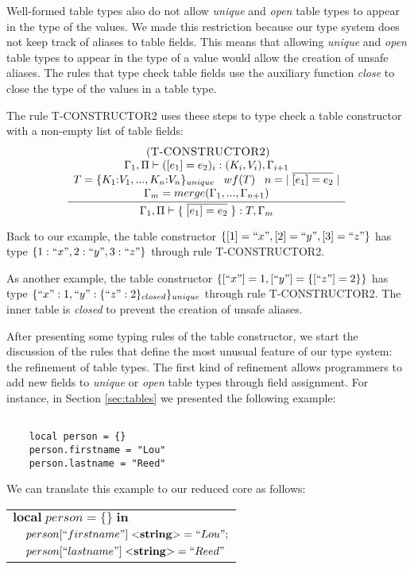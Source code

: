 Well-formed table types also do not allow \emph{unique} and
\emph{open} table types to appear in the type of the values.
We made this restriction because our type system does not keep
track of aliases to table fields.
This means that allowing \emph{unique} and \emph{open} table
types to appear in the type of a value would allow the
creation of unsafe aliases.
The rules that type check table fields use the auxiliary function
\emph{close} to close the type of the values in a table type.

The rule \textsc{T-CONSTRUCTOR2} uses these steps to type check a
table constructor with a non-empty list of table fields:
\[
\begin{array}{c}
\; (\textsc{T-CONSTRUCTOR2})\\
\dfrac{\begin{array}{c}
       \Gamma_{1}, \Pi \vdash ([e_{1}] = e_{2})_{i}:(K_{i},V_{i}), \Gamma_{i+1} \\
       T = \{K_{1}{:}V_{1}, ..., K_{n}{:}V_{n}\}_{unique} \;\;\;
       wf(T) \;\;\;
       n = |\;\overline{[e_{1}] = e_{2}}\;| \\
       \Gamma_{m} = merge(\Gamma_{1}, ..., \Gamma_{n+1}) 
       \end{array}}
      {\Gamma_{1}, \Pi \vdash \{\;\overline{[e_{1}] = e_{2}}\;\}:T, \Gamma_{m}}
\end{array}
\]

Back to our example, the table constructor
$\{ [1] = ``x", [2] = ``y", [3] = ``z" \}$ has type
$\{1:``x", 2:``y", 3:``z"\}$ through rule \textsc{T-CONSTRUCTOR2}.

As another example, the table constructor $\{[``x"] = 1, [``y"] = \{[``z"] = 2\}\}$
has type $\{``x":1, ``y":\{``z":2\}_{closed}\}_{unique}$ through rule
\textsc{T-CONSTRUCTOR2}.
The inner table is \emph{closed} to prevent the creation of unsafe aliases.

After presenting some typing rules of the table constructor,
we start the discussion of the rules that define the most
unusual feature of our type system: the refinement of table types.
The first kind of refinement allows programmers to add new
fields to \emph{unique} or \emph{open} table types through
field assignment.
For instance, in Section \ref{sec:tables} we presented the
following example:
\begin{verbatim}

    local person = {}
    person.firstname = "Lou"
    person.lastname = "Reed"
\end{verbatim}

We can translate this example to our reduced core as follows:
\begin{center}
\begin{tabular}{ll}
\multicolumn{2}{l}{$\mathbf{local} \; person = \{\} \; \mathbf{in}$}\\
& \multicolumn{1}{l}{$person[``firstname"] \; {<}\mathbf{string}{>} = ``Lou";$}\\
& \multicolumn{1}{l}{$person[``lastname"] \; {<}\mathbf{string}{>} = ``Reed"$}
\end{tabular}
\end{center}

